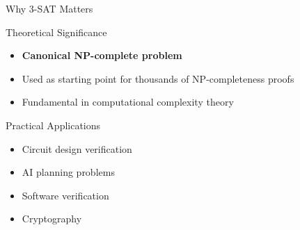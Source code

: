 \documentclass{beamer}
\begin{document}
\begin{frame}{Why 3-SAT Matters}
    \begin{block}{Theoretical Significance}
        \begin{itemize}
            \item \textbf{Canonical NP-complete problem}
            \item Used as starting point for thousands of NP-completeness proofs
            \item Fundamental in computational complexity theory
        \end{itemize}
    \end{block}
    
    \begin{alertblock}{Practical Applications}
        \begin{itemize}
            \item Circuit design verification
            \item AI planning problems
            \item Software verification
            \item Cryptography
        \end{itemize}
    \end{alertblock}
\end{frame}
\end{document}
